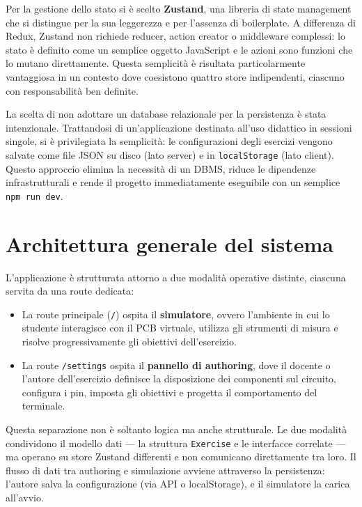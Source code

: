 Per la gestione dello stato si è scelto \textbf{Zustand}, una libreria di state management che si distingue per la sua leggerezza e per l'assenza di boilerplate. A differenza di Redux, Zustand non richiede reducer, action creator o middleware complessi: lo stato è definito come un semplice oggetto JavaScript e le azioni sono funzioni che lo mutano direttamente. Questa semplicità è risultata particolarmente vantaggiosa in un contesto dove coesistono quattro store indipendenti, ciascuno con responsabilità ben definite.

La scelta di non adottare un database relazionale per la persistenza è stata intenzionale. Trattandosi di un'applicazione destinata all'uso didattico in sessioni singole, si è privilegiata la semplicità: le configurazioni degli esercizi vengono salvate come file JSON su disco (lato server) e in \texttt{localStorage} (lato client). Questo approccio elimina la necessità di un DBMS, riduce le dipendenze infrastrutturali e rende il progetto immediatamente eseguibile con un semplice \texttt{npm run dev}.


\section{Architettura generale del sistema}
\label{sec:architettura-generale}

L'applicazione è strutturata attorno a due modalità operative distinte, ciascuna servita da una route dedicata:

\begin{itemize}
    \item La route principale (\texttt{/}) ospita il \textbf{simulatore}, ovvero l'ambiente in cui lo studente interagisce con il PCB virtuale, utilizza gli strumenti di misura e risolve progressivamente gli obiettivi dell'esercizio.
    \item La route \texttt{/settings} ospita il \textbf{pannello di authoring}, dove il docente o l'autore dell'esercizio definisce la disposizione dei componenti sul circuito, configura i pin, imposta gli obiettivi e progetta il comportamento del terminale.
\end{itemize}

Questa separazione non è soltanto logica ma anche strutturale. Le due modalità condividono il modello dati --- la struttura \texttt{Exercise} e le interfacce correlate --- ma operano su store Zustand differenti e non comunicano direttamente tra loro. Il flusso di dati tra authoring e simulazione avviene attraverso la persistenza: l'autore salva la configurazione (via API o localStorage), e il simulatore la carica all'avvio.


